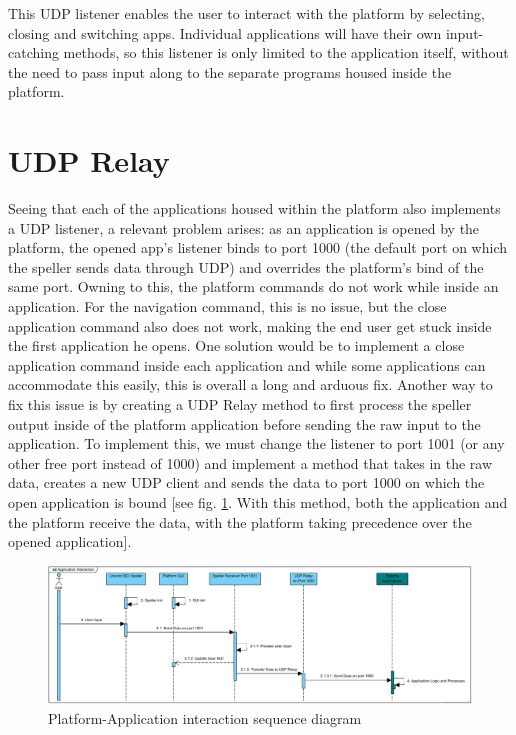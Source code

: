 This UDP listener enables the user to interact with the platform by selecting, closing and switching apps. Individual applications will have their own input-catching methods, so this listener is only limited to the application itself, without the need to pass input along to the separate programs housed inside the platform.

\section{UDP Relay} \label{sect:UDP Relay}
Seeing that each of the applications housed within the platform also implements a UDP listener, a relevant problem arises: as an application is opened by the platform, the opened app's listener binds to port 1000 (the default port on which the speller sends data through UDP) and overrides the platform's bind of the same port. Owning to this, the platform commands do not work while inside an application. For the navigation command, this is no issue, but the close application command also does not work, making the end user get stuck inside the first application he opens. One solution would be to implement a close application command inside each application and while some applications can accommodate this easily, this is overall a long and arduous fix.
\vspace{\baselineskip}\newline
Another way to fix this issue is by creating a UDP Relay method to first process the speller output inside of the platform application before sending the raw input to the application. To implement this, we must change the listener to port 1001 (or any other free port instead of 1000) and implement a method that takes in the raw data, creates a new UDP client and sends the data to port 1000 on which the open application is bound [see fig. \ref{fig:platform-app interaction}. With this method, both the application and the platform receive the data, with the platform taking precedence over the opened application].

\begin{figure}[H]
  \centering
  \includegraphics[width=1\textwidth]{Diagrams/Sequence/Platform - Application Interaction.png}
  \caption{Platform-Application interaction sequence diagram}
  \label{fig:platform-app interaction}
\end{figure}


